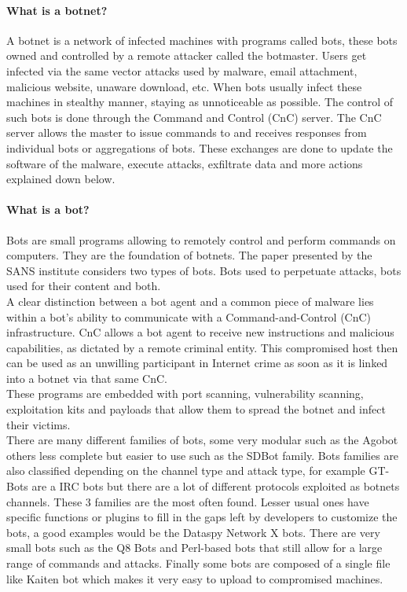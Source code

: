 \paragraph{What is a botnet?} A botnet is a network of infected machines with programs called bots, these bots owned and controlled by a remote attacker called the botmaster. Users get infected via the same vector attacks used by malware, email attachment, malicious website, unaware download, etc. When bots usually infect these machines in stealthy manner, staying as unnoticeable as possible\cite{detection1}. The control of such bots is done through the Command and Control (CnC) server. The CnC server allows the master to issue commands to and receives responses from individual bots or aggregations of bots. These exchanges are done to update the software of the malware, execute attacks, exfiltrate data and more actions explained down below\cite{survey3}\cite{honeynet}.

\paragraph{What is a bot?} Bots are small programs allowing to remotely control and perform commands on computers. They are the foundation of botnets. The paper presented by the SANS institute considers two types of bots. Bots used to perpetuate attacks, bots used for their content and both\cite{tracking}. \\
A clear distinction between a bot agent and a common piece of malware lies within a bot's ability to communicate with a Command-and-Control (CnC) infrastructure. CnC allows a bot agent to receive new instructions and malicious capabilities, as dictated by a remote criminal entity. This compromised host then can be used as an unwilling participant in Internet crime as soon as it is linked into a botnet via that same CnC.\\
These programs are embedded with port scanning, vulnerability scanning, exploitation kits and payloads that allow them to spread the botnet and infect their victims\cite{bot-com}.\\
There are many different families of bots, some very modular such as the Agobot others less complete but easier to use such as the SDBot family. Bots families are also classified depending on the channel type and attack type, for example GT-Bots are a IRC bots but there are a lot of different protocols exploited as botnets channels. These 3 families are the most often found. Lesser usual ones have specific functions or plugins to fill in the gaps left by developers to customize the bots, a good examples would be the Dataspy Network X bots. There are very small bots such as the Q8 Bots and Perl-based bots that still allow for a large range of commands and attacks. Finally some bots are composed of a single file like Kaiten bot which makes it very easy to upload to compromised machines.

